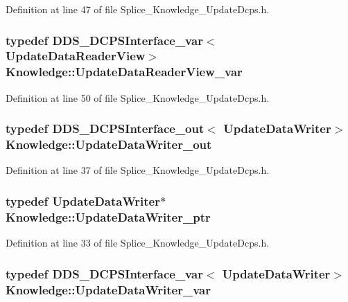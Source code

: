 Definition at line 47 of file Splice\_\-Knowledge\_\-UpdateDcps.h.

\hypertarget{namespaceKnowledge_ad97d086c37b8c4370a3dbd0fa1f4b86a}{
\subsubsection[{UpdateDataReaderView\_\-var}]{\setlength{\rightskip}{0pt plus 5cm}typedef DDS\_\-DCPSInterface\_\-var$<$ {\bf UpdateDataReaderView}$>$ {\bf Knowledge::UpdateDataReaderView\_\-var}}}
\label{da/d50/namespaceKnowledge_ad97d086c37b8c4370a3dbd0fa1f4b86a}


Definition at line 50 of file Splice\_\-Knowledge\_\-UpdateDcps.h.

\hypertarget{namespaceKnowledge_a400a4e00825d1958022850074dd293de}{
\subsubsection[{UpdateDataWriter\_\-out}]{\setlength{\rightskip}{0pt plus 5cm}typedef DDS\_\-DCPSInterface\_\-out$<$ {\bf UpdateDataWriter}$>$ {\bf Knowledge::UpdateDataWriter\_\-out}}}
\label{da/d50/namespaceKnowledge_a400a4e00825d1958022850074dd293de}


Definition at line 37 of file Splice\_\-Knowledge\_\-UpdateDcps.h.

\hypertarget{namespaceKnowledge_aa32f34fdd4439201a0163b9e6a6713d7}{
\subsubsection[{UpdateDataWriter\_\-ptr}]{\setlength{\rightskip}{0pt plus 5cm}typedef {\bf UpdateDataWriter}$\ast$ {\bf Knowledge::UpdateDataWriter\_\-ptr}}}
\label{da/d50/namespaceKnowledge_aa32f34fdd4439201a0163b9e6a6713d7}


Definition at line 33 of file Splice\_\-Knowledge\_\-UpdateDcps.h.

\hypertarget{namespaceKnowledge_a560a08cffb536bdec78ec681bd76c4b5}{
\subsubsection[{UpdateDataWriter\_\-var}]{\setlength{\rightskip}{0pt plus 5cm}typedef DDS\_\-DCPSInterface\_\-var$<$ {\bf UpdateDataWriter}$>$ {\bf Knowledge::UpdateDataWriter\_\-var}}}
\label{da/d50/namespaceKnowledge_a560a08cffb536bdec78ec681bd76c4b5}


